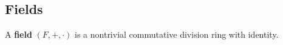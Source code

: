 \subsection{Fields}\label{sec:fields}

\begin{definition}\label{def:field}
  A \textbf{field} \( (F, +, \cdot) \) is a nontrivial commutative division ring with identity.
\end{definition}
